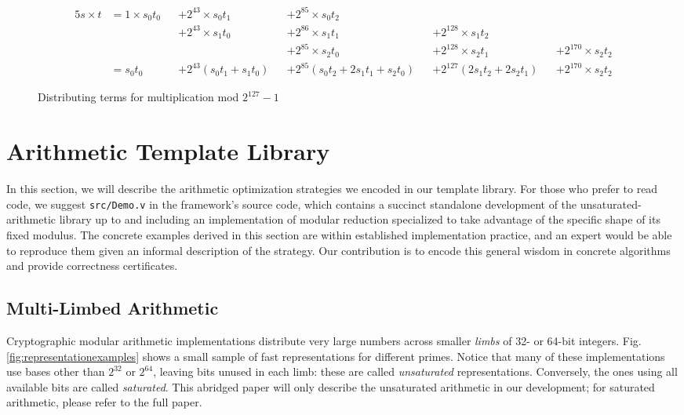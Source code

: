\documentclass[letterpaper,twocolumn,10pt]{article}
\begin{document}
\begin{figure*}
\begin{alignat*}{5}
    s \times t & = 1 \times s_0t_0 && + 2^{43} \times s_0t_1 && + 2^{85} \times s_0t_2 \\
    & && + 2^{43} \times s_1t_0 && + 2^{86} \times s_1t_1 && + 2^{128} \times s_1t_2 \\
    & && && + 2^{85} \times s_2t_0 && + 2^{128} \times s_2t_1 && + 2^{170} \times s_2t_2 \\
    & = s_0t_0 && + 2^{43}(s_0t_1 + s_1t_0) && + 2^{85}(s_0t_2 + 2s_1t_1 + s_2t_0) && + 2^{127}(2s_1t_2 + 2s_2t_1) && + 2^{170}\times s_2t_2
\end{alignat*}
    \caption{\label{distribute}Distributing terms for multiplication mod $2^{127}-1$}
\end{figure*}


\section{Arithmetic Template Library}\label{templates}

In this section, we will describe the arithmetic optimization strategies we encoded in our template library.
For those who prefer to read code, we suggest \texttt{src/Demo.v} in the framework's source code, which contains a succinct standalone development of the unsaturated-arithmetic library up to and including an implementation of modular reduction specialized to take advantage of the specific shape of its fixed modulus.
The concrete examples derived in this section are within established implementation practice, and an expert would be able to reproduce them given an informal description of the strategy.
Our contribution is to encode this general wisdom in concrete algorithms and provide correctness certificates.

\subsection{Multi-Limbed Arithmetic}\label{unsaturated}

Cryptographic modular arithmetic implementations distribute very large numbers across smaller \emph{limbs} of 32- or 64-bit integers.
Fig. \ref{fig:representationexamples} shows a small sample of fast representations for different primes.
Notice that many of these implementations use bases other than $2^{32}$ or $2^{64}$, leaving bits unused in each limb: these are called \emph{unsaturated} representations.
Conversely, the ones using all available bits are called \emph{saturated}.
This abridged paper will only describe the unsaturated arithmetic in our development; for saturated arithmetic, please refer to the full paper.
\end{document}
